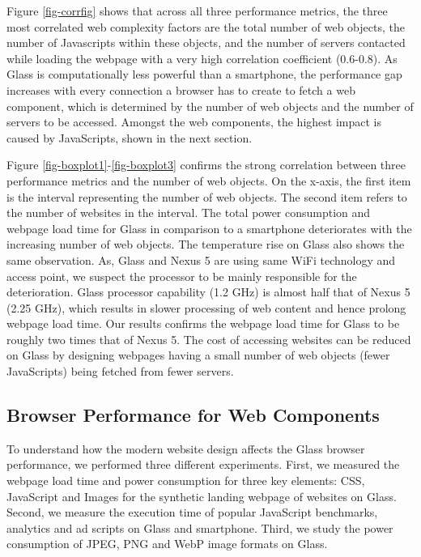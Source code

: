 \documentclass{sig-alternate-10pt}
\begin{document}
Figure \ref{fig-corrfig} shows that across all three performance metrics, the three most correlated web complexity  factors are the total number of web objects, the number of Javascripts within these objects, and the number of servers contacted while loading the webpage with a very high correlation coefficient (0.6-0.8).  As Glass is computationally less powerful than  a smartphone, the performance gap increases with every connection a browser has to create to fetch a web component, which is determined by the number of web objects and the number of servers to be accessed. Amongst the web components, the highest impact   is caused  by  JavaScripts,  shown in the next section.  








Figure \ref{fig-boxplot1}-\ref{fig-boxplot3}   confirms the strong correlation between three performance metrics and the number of web objects.  On the x-axis, the first item is the   interval representing the number of web objects. The second item refers to the number of websites in the interval.  The   total power consumption and webpage load time for Glass in comparison to a smartphone deteriorates with  the increasing number of  web objects. The temperature rise on Glass also shows the same observation. As, Glass and Nexus 5 are using same WiFi technology and  access point, we suspect the processor to be  mainly responsible for the deterioration. Glass  processor capability (1.2 GHz)  is almost half  that of Nexus 5 (2.25 GHz), which results in slower processing of web content and hence prolong webpage load time. Our results confirms the webpage load time for Glass to be roughly two times that of Nexus 5. The  cost of accessing websites can be reduced  on Glass by designing webpages  having a small number of web objects (fewer JavaScripts) being fetched from fewer  servers. 


 
 















\subsection{Browser Performance for Web Components}
To understand how the  modern website design affects the Glass browser performance, we performed three different experiments. First, we measured the webpage load  time and power consumption for three key  elements: CSS, JavaScript and Images for the synthetic landing webpage of websites on Glass. Second, we measure the execution time of  popular JavaScript benchmarks, analytics and ad scripts on Glass and smartphone.  Third, we study the power consumption of JPEG, PNG and WebP image formats on Glass.
\end{document}
